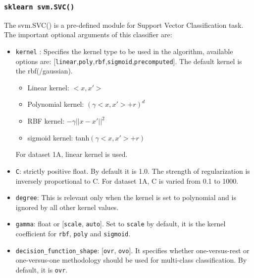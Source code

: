 \documentclass[11pt,a4paper]{article}
\newcommand{\noi}{\noindent}
\def\tt#1{\texttt{#1}}
\begin{document}
\subsubsection{\tt{sklearn svm.SVC()}}
\label{subsubsection:svm module}
The svm.SVC() is a pre-defined module for Support Vector Classification task. The important optional arguments of this classifier are: 
\begin{itemize}
    \item \tt{kernel} : Specifies the kernel type to be used in the algorithm, available options are: [\tt{linear},\tt{poly},\tt{rbf},\tt{sigmoid},\tt{precomputed}].
    The default kernel is the rbf(/gaussian). 
    \begin{itemize}
        \item Linear kernel: $<x,x'>$
        \item Polynomial kernel: $(\gamma<x,x'>+r)^{d}$
        \item RBF kernel: $-\gamma||x-x'||^{2}$
        \item sigmoid kernel: tanh$(\gamma<x,x'>+r)$
    \end{itemize} 

    \noi
    For dataset 1A, linear kernel is used. 
    \item \tt{C}: strictly positive float. By default it is 1.0. The strength of regularization is inversely proportional to C. For dataset 1A, C is varied from 0.1 to 1000. 
    \item \tt{degree}: This is relevant only when the kernel is set to polynomial and is ignored by all other kernel values.
    \item \tt{gamma}: float or [\tt{scale}, \tt{auto}]. Set to \tt{scale} by default, it is the kernel coefficient for \tt{rbf}, \tt{poly} and \tt{sigmoid}.
    \item \tt{decision\_function\_shape}: [\tt{ovr}, \tt{ovo}]. It specifies whether one-versus-rest or one-versus-one methodology should be used for multi-class classification. By default, it is \tt{ovr}. 
\end{itemize}
\end{document}
